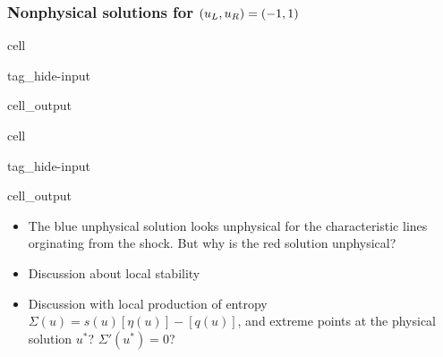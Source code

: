 \documentclass[letterpaper,10pt,english]{jupyterBook}
\begin{document}
\subsubsection{Non\sphinxhyphen{}physical solutions for \protect\((u_L, u_R) = (-1, 1)\protect\)}
\label{\detokenize{ch/pde/hyperbolic-non-convex:non-physical-solutions-for-u-l-u-r-1-1}}\label{\detokenize{ch/pde/hyperbolic-non-convex:pdf-hyperbolic-non-convex-toy-problem-olenik-non-physical}}
\begin{sphinxuseclass}{cell}
\begin{sphinxuseclass}{tag_hide-input}\begin{sphinxVerbatimOutput}

\begin{sphinxuseclass}{cell_output}
\noindent{}

\end{sphinxuseclass}\end{sphinxVerbatimOutput}

\end{sphinxuseclass}
\end{sphinxuseclass}
\begin{sphinxuseclass}{cell}
\begin{sphinxuseclass}{tag_hide-input}\begin{sphinxVerbatimOutput}

\begin{sphinxuseclass}{cell_output}
\noindent{}

\noindent{}

\noindent{}

\end{sphinxuseclass}\end{sphinxVerbatimOutput}

\end{sphinxuseclass}
\end{sphinxuseclass}
\sphinxAtStartPar
{}
\begin{itemize}
\item {} 
\sphinxAtStartPar
The blue unphysical solution looks unphysical for the characteristic lines orginating from the shock. But why is the red solution unphysical?

\item {} 
\sphinxAtStartPar
Discussion about local stability

\item {} 
\sphinxAtStartPar
Discussion with local production of entropy \(\Sigma(u) = s(u) [ \eta (u) ] - [ q(u) ]\), and extreme points at the physical solution \(u^*\)? \(\Sigma'(u^*) = 0\)?

\end{itemize}
\end{document}
